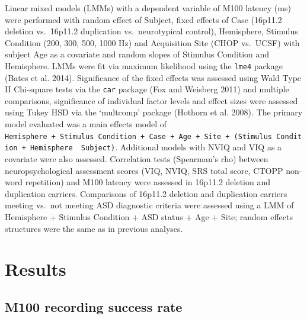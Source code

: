 \documentclass[]{article}
\begin{document}
Linear mixed models (LMMs) with a dependent variable of M100 latency
(ms) were performed with random effect of Subject, fixed effects of Case
(16p11.2 deletion vs.~16p11.2 duplication vs.~neurotypical control),
Hemisphere, Stimulus Condition (200, 300, 500, 1000 Hz) and Acquisition
Site (CHOP vs.~UCSF) with subject Age as a covariate and random slopes
of Stimulus Condition and Hemisphere. LMMs were fit via maximum
likelihood using the \texttt{lme4} package (Bates et al. 2014).
Significance of the fixed effects was assessed using Wald Type II
Chi-square tests via the \texttt{car} package (Fox and Weisberg 2011)
and multiple comparisons, significance of individual factor levels and
effect sizes were assessed using Tukey HSD via the `multcomp' package
(Hothorn et al. 2008). The primary model evaluated was a main effects
model of
\texttt{Hemisphere\ +\ Stimulus\ Condition\ +\ Case\ +\ Age\ +\ Site\ +\ (Stimulus\ Condition\ +\ Hemisphere\ \textbar{}\ Subject)}.
Additional models with NVIQ and VIQ as a covariate were also assessed.
Correlation tests (Spearman's rho) between neuropsychological assessment
scores (VIQ, NVIQ, SRS total score, CTOPP non-word repetition) and M100
latency were assessed in 16p11.2 deletion and duplication carriers.
Comparisons of 16p11.2 deletion and duplication carriers meeting vs.~not
meeting ASD diagnostic criteria were assessed using a LMM of Hemisphere
+ Stimulus Condition + ASD status + Age + Site; random effects
structures were the same as in previous analyses.

\medskip

\section{Results}\label{results}

\subsection{M100 recording success
rate}\label{m100-recording-success-rate}
\end{document}
